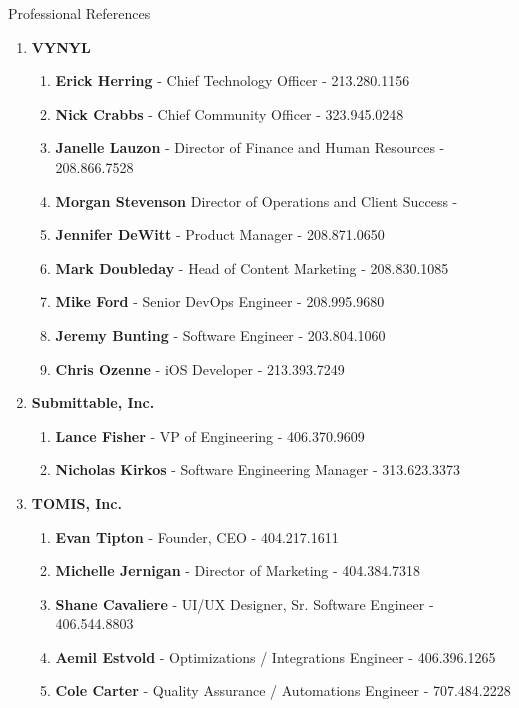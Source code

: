 \documentclass[oneside]{article}%
\begin{document}
\newpage
\noindent
\huge{Professional References}\\
\small
\begin{enumerate}[]
	\item \large \textbf{VYNYL} \small
		\begin{enumerate}[]
			\item \textbf{Erick Herring} - Chief Technology Officer - 213.280.1156
			\item \textbf{Nick Crabbs} - Chief Community Officer - 323.945.0248
			\item \textbf{Janelle Lauzon} - Director of Finance and Human Resources - 208.866.7528
			\item \textbf{Morgan Stevenson} Director of Operations and Client Success - 
			\item \textbf{Jennifer DeWitt} - Product Manager - 208.871.0650
			\item \textbf{Mark Doubleday} - Head of Content Marketing - 208.830.1085
			\item \textbf{Mike Ford} - Senior DevOps Engineer - 208.995.9680
			\item \textbf{Jeremy Bunting} - Software Engineer - 203.804.1060
			\item \textbf{Chris Ozenne} - iOS Developer - 213.393.7249
		\end{enumerate}
	\item \large \textbf{Submittable, Inc.} \small
		\begin{enumerate}[]
			\item \textbf{Lance Fisher} - VP of Engineering - 406.370.9609
			\item \textbf{Nicholas Kirkos} - Software Engineering Manager - 313.623.3373
		\end{enumerate}
	\item \large \textbf{TOMIS, Inc.} \small
		\begin{enumerate}[]
			\item \textbf{Evan Tipton} - Founder, CEO - 404.217.1611
			\item \textbf{Michelle Jernigan} - Director of Marketing - 404.384.7318
			\item \textbf{Shane Cavaliere} - UI/UX Designer, Sr. Software Engineer - 406.544.8803
			\item \textbf{Aemil Estvold} - Optimizations / Integrations Engineer - 406.396.1265
			\item \textbf{Cole Carter} - Quality Assurance / Automations Engineer - 707.484.2228
		\end{enumerate}

\end{enumerate}
\end{document}
